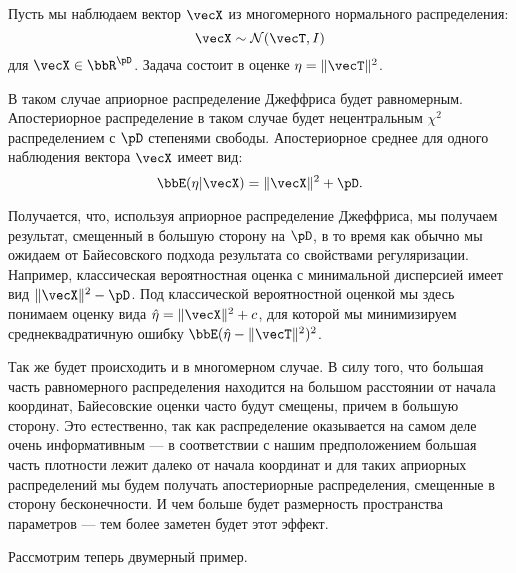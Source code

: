 \begin{example}
Пусть мы наблюдаем вектор $\vecX$ из многомерного нормального распределения: 
\[
\vecX \sim \mathcal{N}(\vecT, I)
\]
для $\vecX \in \bbR^{\pD}$.
Задача состоит в оценке $\eta = \|\vecT\|^2$.

В таком случае априорное распределение Джеффриса будет равномерным.
Апостериорное распределение в таком случае будет нецентральным $\chi^2$ распределением с $\pD$ степенями свободы.
Апостериорное среднее для одного наблюдения вектора $\vecX$ имеет вид:
\[
\bbE (\eta | \vecX) = \|\vecX \|^2 + \pD.
\]

Получается, что, используя априорное распределение Джеффриса, мы получаем результат, смещенный в большую сторону на $\pD$,
в то время как обычно мы ожидаем от Байесовского подхода результата со свойствами регуляризации.
Например, классическая вероятностная оценка с минимальной дисперсией имеет вид $\|\vecX \|^2 - \pD$.
Под классической вероятностной оценкой мы здесь понимаем оценку вида $\hat{\eta} = \|\vecX \|^2 + c$, для которой мы минимизируем среднеквадратичную ошибку $\bbE (\hat{\eta} - \|\vecT \|^2)^2 $.

Так же будет происходить и в многомерном случае.
В силу того, что большая часть равномерного распределения находится на большом расстоянии от начала координат, 
Байесовские оценки часто будут смещены, причем в большую сторону.
Это естественно, так как распределение оказывается на самом деле очень информативным --- в соответствии с нашим предположением большая часть плотности лежит далеко от начала координат и для таких априорных распределений мы будем получать апостериорные распределения, смещенные в сторону бесконечности.
И чем больше будет размерность пространства параметров --- тем более заметен будет этот эффект.


\end{example}
Рассмотрим теперь двумерный пример.

